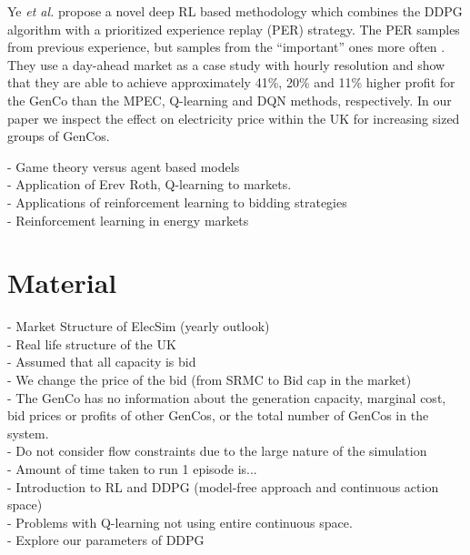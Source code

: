 \documentclass[conference]{IEEEtran}
\begin{document}
Ye \textit{et al.} propose a novel deep RL based methodology which combines the DDPG algorithm with a prioritized experience replay (PER) strategy. The PER samples from previous experience, but samples from the ``important'' ones more often \cite{Schaul2016}. They use a day-ahead market as a case study with hourly resolution and show that they are able to achieve approximately 41\%, 20\% and 11\% higher profit for the GenCo than the MPEC, Q-learning and DQN methods, respectively. In our paper we inspect the effect on electricity price within the UK for increasing sized groups of GenCos.






- Game theory versus agent based models\\

- Application of Erev Roth, Q-learning to markets.\\

- Applications of reinforcement learning to bidding strategies \\
- Reinforcement learning in energy markets \\


\section{Material}
\label{sec:material}

- Market Structure of ElecSim (yearly outlook) \\
- Real life structure of the UK\\
- Assumed that all capacity is bid\\
- We change the price of the bid (from SRMC to Bid cap in the market)\\
- The GenCo has no information about the generation capacity, marginal cost, bid prices or profits of other GenCos, or the total number of GenCos in the system. \cite{EsmaeiliAliabadi2017}\\

- Do not consider flow constraints due to the large nature of the simulation\\
- Amount of time taken to run 1 episode is...\\ 


- Introduction to RL and DDPG (model-free approach and continuous action space) \\
- Problems with Q-learning not using entire continuous space. \\
- Explore our parameters of DDPG
\end{document}
